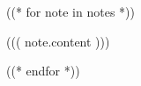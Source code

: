 \documentclass[a4paper, 12pt]{article}
\begin{document}
((* for note in notes *))

((( note.content )))
\clearpage

((* endfor *))
\end{document}
